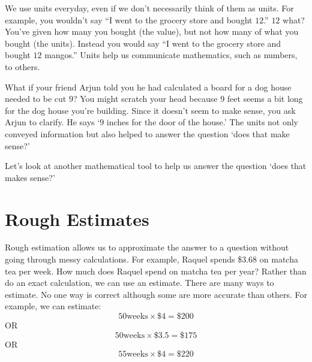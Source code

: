 \documentclass{ximera}
\begin{document}






We use units everyday, even if we don't necessarily think of them as units.  For example, you wouldn't say ``I went to the grocery store and bought $12$.''  $12$ what?  You've given how many you bought (the value), but not how many of what you bought (the units).  Instead you would say ``I went to the grocery store and bought $12$ mangos.'' Units help us communicate mathematics, such as numbers, to others.

What if your friend Arjun told you he had calculated a board for a dog house needed to be cut $9$? You might scratch your head because $9$ feet seems a bit long for the dog house you're building. Since it doesn't seem to make sense, you ask Arjun to clarify. He says `$9$ inches for the door of the house.' The units not only conveyed information but also helped to answer the question `does that make sense?'

Let's look at another mathematical tool to help us answer the question `does that makes sense?'

\section{Rough Estimates}
Rough estimation allows us to approximate the answer to a question without going through messy calculations. For example, Raquel spends \$$3.68$ on matcha tea per week. How much does Raquel spend on matcha tea per year? Rather than do an exact calculation, we can use an estimate. There are many ways to estimate.  No one way is correct although some are more accurate than others. For example, we can estimate:
$$50 \text{weeks} \times \$4=\$200$$
OR $$50 \text{weeks} \times \$3.5=\$175$$
OR $$55 \text{weeks} \times \$4=\$220$$
\end{document}
